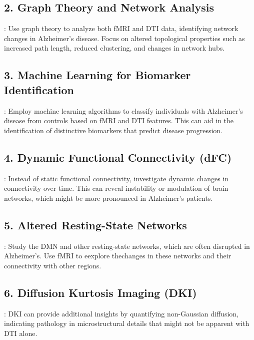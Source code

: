 \documentclass[twocolumn]{article}
\begin{document}
\subsection*{2. Graph Theory and Network Analysis}

: Use graph theory to analyze both fMRI and DTI data, identifying network changes in Alzheimer's disease.
Focus on altered topological properties such as increased path length, reduced clustering, and changes in network hubs.

\subsection*{3. Machine Learning for Biomarker Identification}

: Employ machine learning algorithms to classify individuals with Alzheimer's disease from controls based on
fMRI and DTI features. This can aid in the identification of distinctive biomarkers that predict disease progression.

\subsection*{4. Dynamic Functional Connectivity (dFC)}

: Instead of static functional connectivity, investigate dynamic changes in connectivity over
time. This can reveal instability or modulation of brain networks, which might be more pronounced in Alzheimer's patients.

\subsection*{5. Altered Resting-State Networks}

: Study the DMN and other resting-state networks, which are often disrupted in Alzheimer's. Use
fMRI to eexplore thechanges in these networks and their connectivity with other regions.

\subsection*{6. Diffusion Kurtosis Imaging (DKI)}

: DKI can provide additional insights by quantifying non-Gaussian diffusion, indicating pathology in
microstructural details that might not be apparent with DTI alone.
\end{document}
